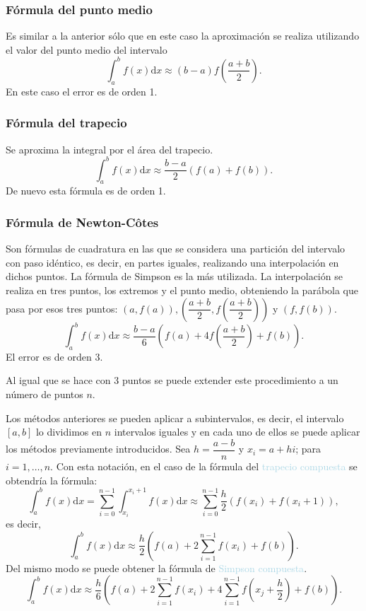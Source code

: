 \subsubsection{Fórmula del punto medio}
Es similar a la anterior sólo que en este caso la aproximación se realiza utilizando el valor del punto medio del intervalo \[ \int_a^b f(x)\mathrm{d}x\approx(b-a)f\left(\dfrac{a+b}{2}\right). \] En este caso el error es de orden 1. 
\subsubsection{Fórmula del trapecio}
Se aproxima la integral por el área del trapecio. \[ \int_a^bf(x)\mathrm{d}x\approx\dfrac{b-a}{2}\left(f(a)+f(b)\right). \]De nuevo esta fórmula es de orden 1.
\subsubsection{Fórmula de Newton-Côtes}
Son fórmulas de cuadratura en las que se considera una partición del intervalo con paso idéntico, es decir, en partes iguales, realizando una interpolación en dichos puntos. La fórmula de Simpson es la más utilizada. La interpolación se realiza en tres puntos, los extremos y el punto medio, obteniendo la parábola que pasa por esos tres puntos: $\left(a,f(a)\right),\left(\dfrac{a+b}{2},f\left(\dfrac{a+b}{2}\right)\right)$ y $(f,f(b))$. \[ \int_a^bf(x)\mathrm{d}x\approx\dfrac{b-a}{6}\left(f(a)+4f\left(\dfrac{a+b}{2}\right)+f(b)\right). \] El error es de orden 3.

Al igual que se hace con 3 puntos se puede extender este procedimiento a un número de puntos $n$.

Los métodos anteriores se pueden aplicar a subintervalos, es decir, el intervalo $[a,b]$ lo dividimos en $n$ intervalos iguales y en cada uno de ellos se puede aplicar los métodos previamente introducidos. Sea $h=\dfrac{a-b}{n}$ y $x_i=a+hi$; para $i=1,\hdots,n$. Con esta notación, en el caso de la fórmula del \textcolor{lightblue}{trapecio compuesta} se obtendría la fórmula: \[ \int_a^bf(x)\mathrm{d}x=\sum_{i=0}^{n-1}\int_{x_i}^{x_i+1}f(x)\mathrm{d}x\approx\sum_{i=0}^{n-1}\dfrac{h}{2}\left(f(x_i)+f(x_i+1)\right), \] es decir, \[ \int_a^bf(x)\mathrm{d}x\approx\dfrac{h}{2}\left(f(a)+2\sum_{i=1}^{n-1}f(x_i)+f(b)\right). \] Del mismo modo se puede obtener la fórmula de \textcolor{lightblue}{Simpson compuesta}. \[ \int_a^bf(x)\mathrm{d}x\approx\dfrac{h}{6}\left(f(a)+2\sum_{i=1}^{n-1}f(x_i)+4\sum_{i=1}^{n-1}f\left(x_j+\dfrac{h}{2}\right)+f(b)\right). \]
